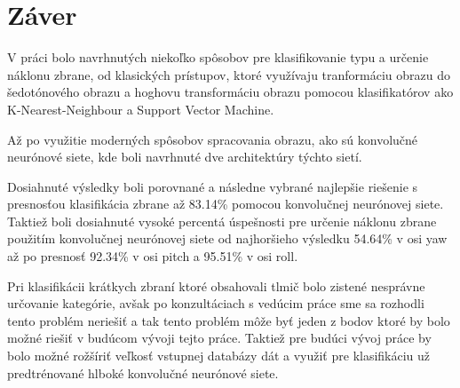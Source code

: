 
\chapter{Záver}

V práci bolo navrhnutých niekoľko spôsobov pre klasifikovanie typu a určenie náklonu zbrane, od klasických prístupov,
    ktoré využívaju tranformáciu obrazu do šedotónového obrazu a hoghovu transformáciu obrazu pomocou
    klasifikatórov ako K-Nearest-Neighbour a Support Vector Machine.

Až po využitie moderných spôsobov spracovania obrazu, ako sú konvolučné neurónové siete, kde boli navrhnuté
    dve architektúry týchto sietí.

Dosiahnuté výsledky boli porovnané a následne vybrané najlepšie riešenie s presnosťou klasifikácia zbrane až 83.14\%
    pomocou konvolučnej neurónovej siete.
Taktiež boli dosiahnuté vysoké percentá úspešnosti pre určenie náklonu zbrane použitím konvolučnej neurónovej siete od
    najhoršieho výsledku 54.64\% v osi yaw až po presnosť 92.34\% v osi pitch a 95.51\% v osi roll.

Pri klasifikácii krátkych zbraní ktoré obsahovali tlmič bolo zistené nesprávne určovanie kategórie, avšak po
    konzultáciach s vedúcim práce sme sa rozhodli tento problém neriešiť a tak tento problém môže byť jeden z bodov ktoré by
    bolo možné riešiť v budúcom vývoji tejto práce.
Taktiež pre budúci vývoj práce by bolo možné rožšíriť veľkosť vstupnej databázy dát a využiť pre klasifikáciu
    už predtrénované hlboké konvolučné neurónové siete.
